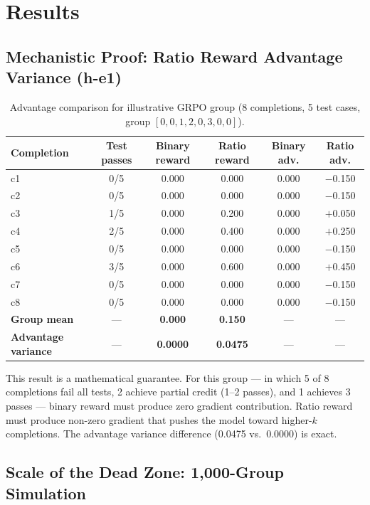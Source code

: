 \section{Results}
\label{sec:results}

\subsection{Mechanistic Proof: Ratio Reward Advantage Variance (h-e1)}

\begin{table}[h]
\centering
\caption{Advantage comparison for illustrative GRPO group (8 completions, 5 test cases, group $[0,0,1,2,0,3,0,0]$).}
\label{tab:advantages}
\begin{tabular}{lccccc}
\toprule
\textbf{Completion} & \textbf{Test passes} & \textbf{Binary reward} & \textbf{Ratio reward} & \textbf{Binary adv.} & \textbf{Ratio adv.} \\
\midrule
c1 & 0/5 & 0.000 & 0.000 & 0.000 & $-$0.150 \\
c2 & 0/5 & 0.000 & 0.000 & 0.000 & $-$0.150 \\
c3 & 1/5 & 0.000 & 0.200 & 0.000 & $+$0.050 \\
c4 & 2/5 & 0.000 & 0.400 & 0.000 & $+$0.250 \\
c5 & 0/5 & 0.000 & 0.000 & 0.000 & $-$0.150 \\
c6 & 3/5 & 0.000 & 0.600 & 0.000 & $+$0.450 \\
c7 & 0/5 & 0.000 & 0.000 & 0.000 & $-$0.150 \\
c8 & 0/5 & 0.000 & 0.000 & 0.000 & $-$0.150 \\
\midrule
\textbf{Group mean} & --- & \textbf{0.000} & \textbf{0.150} & --- & --- \\
\textbf{Advantage variance} & --- & \textbf{0.0000} & \textbf{0.0475} & --- & --- \\
\bottomrule
\end{tabular}
\end{table}

This result is a mathematical guarantee. For this group --- in which 5 of 8 completions fail all tests, 2 achieve partial credit (1--2 passes), and 1 achieves 3 passes --- binary reward must produce zero gradient contribution. Ratio reward must produce non-zero gradient that pushes the model toward higher-$k$ completions. The advantage variance difference (0.0475 vs.\ 0.0000) is exact.

\subsection{Scale of the Dead Zone: 1,000-Group Simulation}

